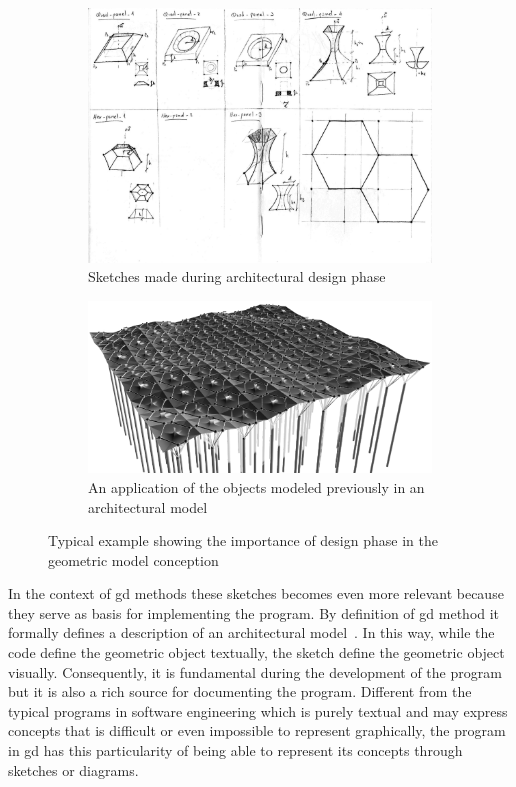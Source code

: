 \begin{figure}
\centering
\begin{subfigure}{.6\textwidth}
  \centering
  \includegraphics[width=.95\linewidth]{images/real-sketch}
  \caption{Sketches made during architectural design phase}
  \label{fig:sketch-fig}
\end{subfigure}%
\begin{subfigure}{.4\textwidth}
  \centering
  \includegraphics[width=1.0\linewidth]{images/real-sketch-result1}
  \caption{An application of the objects modeled previously in an architectural model}
  \label{fig:sketch-fig-result}
\end{subfigure}
\caption{Typical example showing the importance of design phase in the geometric model conception}
\label{fig:sketch-using}
\end{figure}

In the context of \gls{gd} methods these sketches becomes even more relevant because they serve as basis for implementing the program. By definition of \gls{gd} method it formally defines a description of an architectural model~\citep{mccormack2004generative}. In this way, while the code define the geometric object textually, the sketch define the geometric object visually. Consequently, it is fundamental during the development of the program but it is also a rich source for documenting the program. Different from the typical programs in software engineering which is purely textual and may express concepts that is difficult or even impossible to represent graphically, the program in \gls{gd} has this particularity of being able to represent its concepts through sketches or diagrams.

